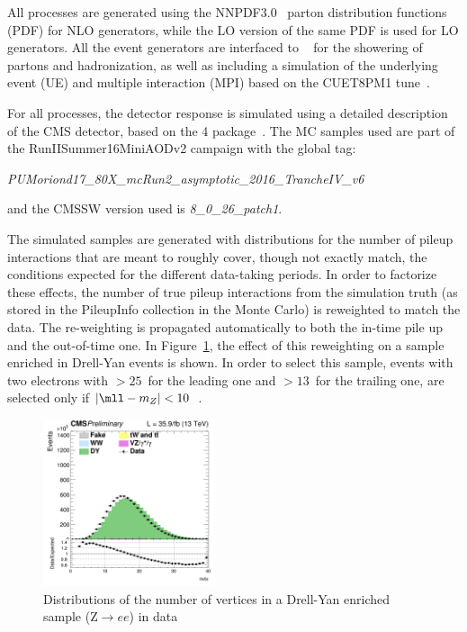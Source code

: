 All processes are generated using the NNPDF3.0~\cite{Ball:2013hta,Ball:2011uy} parton distribution functions (PDF) for NLO generators,
while the LO version of the same PDF is used for LO generators. All the event generators are interfaced 
to ~\cite{Sjostrand:2007gs} for the showering of
partons and hadronization, as well as including a simulation of the underlying event (UE) and multiple interaction (MPI)
based on the CUET8PM1 tune~\cite{Khachatryan:2015pea}. 
%
%

For all processes, the detector response is simulated using a detailed
description of the CMS detector, based on the \GEANT{}4 package~\cite{Agostinelli:2002hh}. 
The MC samples used  are part of the RunIISummer16MiniAODv2 campaign with the global tag:
\begin{center} \emph{PUMoriond17\_80X\_mcRun2\_asymptotic\_2016\_TrancheIV\_v6} \end{center}
and the CMSSW version used is \emph{8\_0\_26\_patch1}.

The simulated samples are generated with distributions for the number of pileup interactions that are meant to roughly cover,
though not exactly match, the conditions expected for the different data-taking periods. In order to factorize these effects, 
the number of true pileup interactions from the simulation truth (as stored in the PileupInfo collection in the Monte Carlo)
is reweighted to match the data.
The re-weighting is propagated automatically to both the in-time pile up and the out-of-time one.
In Figure~\ref{Fig:pu}, the effect of this reweighting on a sample enriched in Drell-Yan events is shown.
In order to select this sample, 
events with two electrons with \pt$> 25$~\GeV for the leading one and  \pt$>
13$~\GeV for the trailing one, are selected only if  $|\mll - m_Z| < 10$~\GeV. 

\begin{figure}[htbp]
\centering
\includegraphics[width=0.45\textwidth]{Figs/nvertices.png}
\caption{
    Distributions of the number of vertices in a Drell-Yan enriched sample
    (Z$\rightarrow{}ee$) in
    data}
    \label{Fig:pu}
\end{figure}

